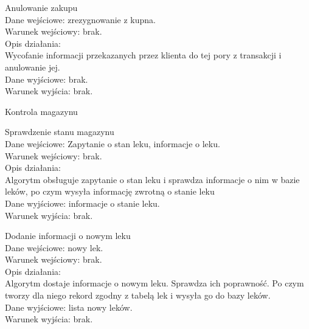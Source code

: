 \documentclass[a4paper, 11pt]{article}
\begin{document}
\begin{myEnumerate}
\begin{myEnumerate}
	
		
		
	\item  Anulowanie zakupu\\
	Dane wejściowe: zrezygnowanie z kupna.\\
	Warunek wejściowy: brak.\\
	Opis działania:\\
		Wycofanie informacji przekazanych przez klienta do tej pory z transakcji i anulowanie jej. \\
	Dane wyjściowe: brak.\\
	Warunek wyjścia: brak.\\	
	\end{myEnumerate}
	
	\item Kontrola magazynu
	\begin{myEnumerate}
	\item Sprawdzenie stanu magazynu\\
	Dane wejściowe: Zapytanie o stan leku, informacje o leku.\\
	Warunek wejściowy: brak.\\
	Opis działania:\\
		Algorytm obsługuje zapytanie o stan leku i sprawdza informacje o nim w bazie leków, po czym wysyła informację zwrotną o stanie leku\\
	Dane wyjściowe: informacje o stanie leku.\\	
	Warunek wyjścia: brak.\\
	\item Dodanie informacji o nowym leku\\
	Dane wejściowe: nowy lek.\\
	Warunek wejściowy: brak.\\
	Opis działania:\\
		Algorytm dostaje informacje o nowym leku. Sprawdza ich poprawność. Po czym tworzy dla niego rekord zgodny z tabelą lek i wysyła go do bazy leków. \\		Dane wyjściowe: lista nowy leków.\\
	Warunek wyjścia: brak.\\
\end{myEnumerate}		
	

\end{myEnumerate}
\end{document}
